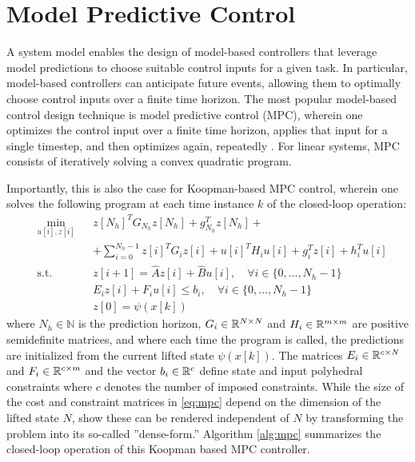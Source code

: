 \section{Model Predictive Control}
\label{sec:mpc}

A system model enables the design of model-based controllers that leverage model predictions to choose suitable control inputs for a given task.
In particular, model-based controllers can anticipate future events, allowing them to optimally choose control inputs over a finite time horizon.
The most popular model-based control design technique is model predictive control (MPC), wherein one optimizes the control input over a finite time horizon, applies that input for a single timestep, and then optimizes again, repeatedly \cite{rawlings2009model}.
For linear systems, MPC consists of iteratively solving a convex quadratic program.

Importantly, this is also the case for Koopman-based MPC control, wherein one solves the following program at each time instance $k$ of the closed-loop operation:
\begin{equation}
\begin{aligned}
& \underset{u[i] , z[i]}{\text{min}}
& & z[N_h]^{T} G_{N_h} z[N_h] + g_{N_h}^T z[N_h] +  \\
&&& + \sum_{i=0}^{N_h - 1} z[i]^T G_i z[i] + u[i]^T H_i u[i] + g_i^T z[i] + h_i^T u[i]\\
& \text{s.t.}
& & z[i+1] = \hat{A} z[i] + \hat{B} u[i] , \quad \forall i \in \{ 0 , \ldots , N_h - 1 \} \\
&&& E_i z[i] + F_i u[i] \leq b_i , \quad \forall i \in \{ 0 , \ldots , N_h - 1\} \\
&&& z[0] = \psi (x[k])
\end{aligned} \label{eq:mpc}
\end{equation}
where $N_h \in \mathbb{N}$ is the prediction horizon, $G_i \in \mathbb{R}^{N \times N}$ and $H_i \in \mathbb{R}^{m \times m}$ are positive semidefinite matrices, and where each time the program is called, the predictions are initialized from the current lifted state $\psi (x[k])$.
The matrices $E_i \in \mathbb{R}^{c \times N}$ and $F_i \in \mathbb{R}^{c \times m}$ and the vector $b_i \in \mathbb{R}^{c}$ define state and input polyhedral constraints where $c$ denotes the number of imposed constraints.
While the size of the cost and constraint matrices in \eqref{eq:mpc} depend on the dimension of the lifted state $N$, \citet{korda2018linear} show these can be rendered independent of $N$ by transforming the problem into its so-called ''dense-form.''
Algorithm \ref{alg:mpc} summarizes the closed-loop operation of this Koopman based MPC controller.

